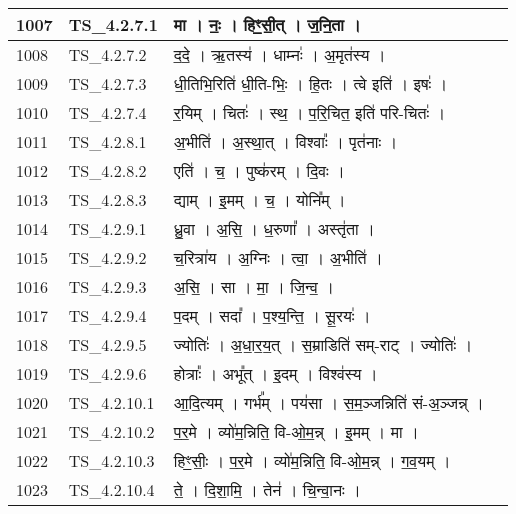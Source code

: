 \documentclass[17pt]{extarticle}
\begin{document}
\begin{longtable}{||p{0.4in}||p{0.9in}||p{4.0in}||p{0.9in}||}
        \hline
            1007 & TS\_4.2.7.1 & मा   ।   नः॒   ।   हिꣳ॒॒सी॒त्   ।   ज॒नि॒ता   ।    &      \\
        \hline
            1008 & TS\_4.2.7.2 & द॒दे॒   ।   ऋ॒तस्य॑   ।   धाम्नः॑   ।   अ॒मृत॑स्य   ।    &      \\
        \hline
            1009 & TS\_4.2.7.3 & धी॒तिभि॒रिति॑ धी॒ति{-}भिः॒   ।   हि॒तः   ।   त्वे इति॑   ।   इषः॑   ।    &      \\
        \hline
            1010 & TS\_4.2.7.4 & र॒यिम्   ।   चितः॑   ।   स्थ॒   ।   प॒रि॒चित॒ इति॑ परि{-}चितः॑   ।    &      \\
        \hline
            1011 & TS\_4.2.8.1 & अ॒भीति॑   ।   अ॒स्था॒त्   ।   विश्वाः᳚   ।   पृत॑नाः   ।    &      \\
        \hline
            1012 & TS\_4.2.8.2 & एति॑   ।   च॒   ।   पुष्क॑रम्   ।   दि॒वः   ।    &      \\
        \hline
            1013 & TS\_4.2.8.3 & द्याम्   ।   इ॒मम्   ।   च॒   ।   योनि᳚म्   ।    &      \\
        \hline
            1014 & TS\_4.2.9.1 & ध्रु॒वा   ।   अ॒सि॒   ।   ध॒रुणा᳚   ।   अस्तृ॑ता   ।    &      \\
        \hline
            1015 & TS\_4.2.9.2 & च॒रित्रा॑य   ।   अ॒ग्निः   ।   त्वा॒   ।   अ॒भीति॑   ।    &      \\
        \hline
            1016 & TS\_4.2.9.3 & अ॒सि॒   ।   सा   ।   मा॒   ।   जि॒न्व॒   ।    &      \\
        \hline
            1017 & TS\_4.2.9.4 & प॒दम्   ।   सदा᳚   ।   प॒श्य॒न्ति॒   ।   सू॒रयः॑   ।    &      \\
        \hline
            1018 & TS\_4.2.9.5 & ज्योतिः॑   ।   अ॒धा॒र॒य॒त्   ।   स॒म्राडिति॑ सम्{-}राट्   ।   ज्योतिः॑   ।    &      \\
        \hline
            1019 & TS\_4.2.9.6 & होत्राः᳚   ।   अभू᳚त्   ।   इ॒दम्   ।   विश्व॑स्य   ।    &      \\
        \hline
            1020 & TS\_4.2.10.1 & आ॒दि॒त्यम्   ।   गर्भ᳚म्   ।   पय॑सा   ।   स॒म॒ञ्जन्निति॑ सं{-}अ॒ञ्जन्न्   ।    &      \\
        \hline
            1021 & TS\_4.2.10.2 & प॒र॒मे   ।   व्यो॑म॒न्निति॒ वि{-}ओ॒म॒न्न्   ।   इ॒मम्   ।   मा   ।    &      \\
        \hline
            1022 & TS\_4.2.10.3 & हिꣳ॒॒सीः॒   ।   प॒र॒मे   ।   व्यो॑म॒न्निति॒ वि{-}ओ॒म॒न्न्   ।   ग॒व॒यम्   ।    &      \\
        \hline
            1023 & TS\_4.2.10.4 & ते॒   ।   दि॒शा॒मि॒   ।   तेन॑   ।   चि॒न्वा॒नः   ।    &      \\

\end{longtable}
\end{document}
